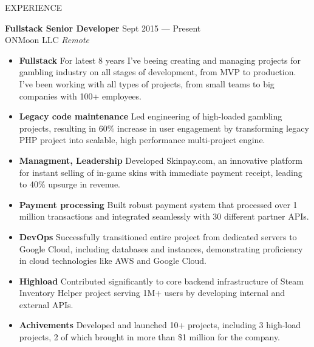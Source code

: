 \documentclass{template} %
\begin{document}
\begin{rSection}{EXPERIENCE}

\textbf{Fullstack Senior Developer} \hfill Sept 2015 --- Present\\
ONMoon LLC \hfill \textit{Remote}

\begin{minipage}{0.95\textwidth}
 \begin{itemize}
    \vspace{0.1cm}
    \itemsep 1pt {} 
    \item \textbf{Fullstack} For latest 8 years I've beeing creating and managing projects for gambling industry on all stages of development, from MVP to production. I've been working with all types of projects, from small teams to big companies with 100+ employees.
    \item \textbf{Legacy code maintenance} Led engineering of high-loaded gambling projects, resulting in 60\% increase in user
    engagement by transforming legacy PHP project into scalable, high performance multi-project engine.
    \item \textbf{Managment, Leadership} Developed Skinpay.com, an innovative platform for instant selling of in-game skins with immediate payment receipt, leading to 40\% upsurge in revenue.
    \item \textbf{Payment processing} Built robust payment system that processed over 1 million transactions and integrated seamlessly with 30 different partner APIs.
    \item \textbf{DevOps} Successfully transitioned entire project from dedicated servers to Google Cloud, including databases and instances, demonstrating proficiency in cloud technologies like AWS and Google Cloud.
    \item \textbf{Highload} Contributed significantly to core backend infrastructure of Steam Inventory Helper project serving 1M+ users by developing internal and external APIs.
    \item \textbf{Achivements} Developed and launched 10+ projects, including 3 high-load projects, 2 of which brought in more than \$1 million for the company.
 \end{itemize}
\end{minipage}

\vspace{0.5cm}


\end{rSection}
\end{document}
